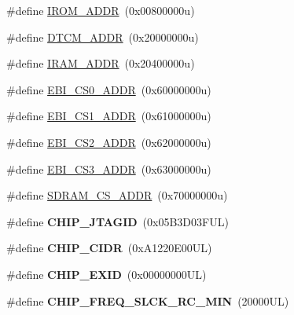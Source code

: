 \begin{DoxyCompactItemize}
\item 
\#define \mbox{\hyperlink{group__SAMV71J21__definitions_ga694212ffb8c2786bacee3d0ad6020bda}{I\+R\+O\+M\+\_\+\+A\+D\+DR}}~(0x00800000u)
\item 
\#define \mbox{\hyperlink{group__SAMV71J21__definitions_ga26626a425f7ebb3a0c2dbc276f0d9f78}{D\+T\+C\+M\+\_\+\+A\+D\+DR}}~(0x20000000u)
\item 
\#define \mbox{\hyperlink{group__SAMV71J21__definitions_gaae45ac2ef16942159481c767ac4805cf}{I\+R\+A\+M\+\_\+\+A\+D\+DR}}~(0x20400000u)
\item 
\#define \mbox{\hyperlink{group__SAMV71J21__definitions_ga9bcbb97ddae3b2cc5e2c9613d33f66b4}{E\+B\+I\+\_\+\+C\+S0\+\_\+\+A\+D\+DR}}~(0x60000000u)
\item 
\#define \mbox{\hyperlink{group__SAMV71J21__definitions_gaaddd9fdbbc77c9aced5308819f502a26}{E\+B\+I\+\_\+\+C\+S1\+\_\+\+A\+D\+DR}}~(0x61000000u)
\item 
\#define \mbox{\hyperlink{group__SAMV71J21__definitions_ga058a35f9991487dc2dd12ada792d0730}{E\+B\+I\+\_\+\+C\+S2\+\_\+\+A\+D\+DR}}~(0x62000000u)
\item 
\#define \mbox{\hyperlink{group__SAMV71J21__definitions_gad66ebdd0fc33ec3cf85dbaa14bbf05d9}{E\+B\+I\+\_\+\+C\+S3\+\_\+\+A\+D\+DR}}~(0x63000000u)
\item 
\#define \mbox{\hyperlink{group__SAMV71J21__definitions_ga61b7db25daf759c2a2beb6e5a0b57a84}{S\+D\+R\+A\+M\+\_\+\+C\+S\+\_\+\+A\+D\+DR}}~(0x70000000u)
\item 
\mbox{\label{group__SAMV71J21__definitions_gaa614519778eec0df55d3eeab3223e3f6}} 
\#define {\bfseries C\+H\+I\+P\+\_\+\+J\+T\+A\+G\+ID}~(0x05\+B3\+D03\+F\+U\+L)
\item 
\mbox{\label{group__SAMV71J21__definitions_ga1e1ae44dd9269a8a98c1d7e7a60e9fbd}} 
\#define {\bfseries C\+H\+I\+P\+\_\+\+C\+I\+DR}~(0x\+A1220\+E00\+U\+L)
\item 
\mbox{\label{group__SAMV71J21__definitions_ga35123717aa86b76bb6b73cf3adc4c2e6}} 
\#define {\bfseries C\+H\+I\+P\+\_\+\+E\+X\+ID}~(0x00000000\+U\+L)
\item 
\mbox{\label{group__SAMV71J21__definitions_ga0e868bf27426399dfdcb3a9dfc3733c4}} 
\#define {\bfseries C\+H\+I\+P\+\_\+\+F\+R\+E\+Q\+\_\+\+S\+L\+C\+K\+\_\+\+R\+C\+\_\+\+M\+IN}~(20000\+U\+L)

\end{DoxyCompactItemize}
